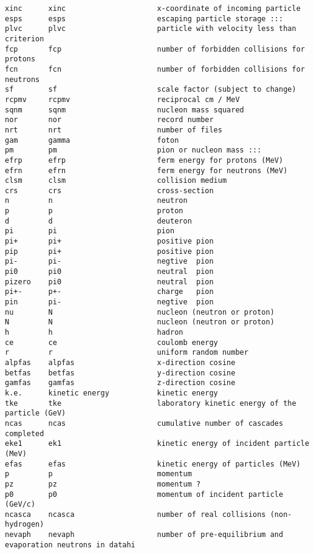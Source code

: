 \begin{verbatim}
xinc      xinc                     x-coordinate of incoming particle 
esps      esps                     escaping particle storage :::  
plvc      plvc                     particle with velocity less than criterion
fcp       fcp                      number of forbidden collisions for protons
fcn       fcn                      number of forbidden collisions for neutrons
sf        sf                       scale factor (subject to change)
rcpmv     rcpmv                    reciprocal cm / MeV
sqnm      sqnm                     nucleon mass squared 
nor       nor                      record number 
nrt       nrt                      number of files 
gam       gamma                    foton
pm        pm                       pion or nucleon mass :::
efrp      efrp                     ferm energy for protons (MeV)
efrn      efrn                     ferm energy for neutrons (MeV)
clsm      clsm                     collision medium
crs       crs                      cross-section
n         n                        neutron
p         p                        proton
d         d                        deuteron
pi        pi                       pion
pi+       pi+                      positive pion
pip       pi+                      positive pion
pi-       pi-                      negtive  pion
pi0       pi0                      neutral  pion
pizero    pi0                      neutral  pion
pi+-      p+-                      charge   pion
pin       pi-                      negtive  pion
nu        N                        nucleon (neutron or proton)  
N         N                        nucleon (neutron or proton)
h         h                        hadron
ce        ce                       coulomb energy
r         r                        uniform random number
alpfas    alpfas                   x-direction cosine
betfas    betfas                   y-direction cosine 
gamfas    gamfas                   z-direction cosine
k.e.      kinetic energy           kinetic energy
tke       tke                      laboratory kinetic energy of the particle (GeV)    
ncas      ncas                     cumulative number of cascades completed
eke1      ek1                      kinetic energy of incident particle (MeV)
efas      efas                     kinetic energy of particles (MeV)
p         p                        momentum
pz        pz                       momentum ?
p0        p0                       momentum of incident particle (GeV/c)
ncasca    ncasca                   number of real collisions (non-hydrogen)
nevaph    nevaph                   number of pre-equilibrium and evaporation neutrons in datahi

\end{verbatim}
